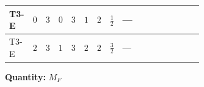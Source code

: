 \documentclass[8pt]{article}
\begin{document}
\begin{landscape}
\begin{longtable}{@{}llcccccc >{\raggedright\arraybackslash}p{0.21\linewidth} >{\raggedright\arraybackslash}p{0.21\linewidth} >{\raggedright\arraybackslash}p{0.21\linewidth}@{}}
\midrule
T3-E & $0$ & $3$ & $0$ & $3$ & $1$ & $2$ & $\frac{1}{2}$ & --- & \scriptsize\adjustbox{max width=\linewidth}{$\begin{gathered} -\frac{9}{2} {g_2}^2 \left({M_F}\right)_{ij}\end{gathered}$} & \scriptsize\adjustbox{max width=\linewidth}{$\begin{gathered} -\frac{3}{2} {g_1}^2 \left({M_F}\right)_{ij}\end{gathered}$} \\
\midrule
T3-E & $2$ & $3$ & $1$ & $3$ & $2$ & $2$ & $\frac{3}{2}$ & --- & \scriptsize\adjustbox{max width=\linewidth}{$\begin{gathered} -\frac{9}{2} {g_2}^2 \left({M_F}\right)_{ij}\end{gathered}$} & \scriptsize\adjustbox{max width=\linewidth}{$\begin{gathered} -\frac{27}{2} {g_1}^2 \left({M_F}\right)_{ij}\end{gathered}$} \\
\midrule
\bottomrule
\end{longtable}
\clearpage
\noindent\textbf{Quantity: }$M_F$\par\smallskip

\end{landscape}
\end{document}
